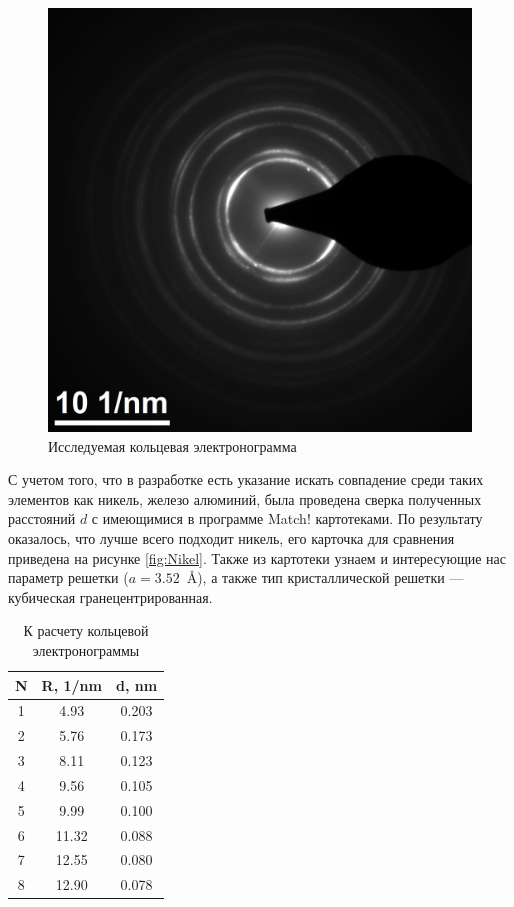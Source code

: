 \documentclass[a4paper, 12pt]{article}
\begin{document}
\begin{figure}[H]
	\centering
	\includegraphics[width=0.7\linewidth]{K3} 
	\caption{Исследуемая кольцевая электронограмма}
	\label{fig:circle}
\end{figure}

С учетом того, что в разработке есть указание искать совпадение среди таких элементов как никель, железо алюминий, была проведена сверка полученных расстояний $d$ с имеющимися в программе Match! картотеками. По результату оказалось, что лучше всего подходит никель, его карточка для сравнения приведена на рисунке \ref{fig:Nikel}. Также из картотеки узнаем и интересующие нас параметр решетки ($a = 3.52$~\AA), а также тип кристаллической решетки --- кубическая гранецентрированная.

\begin{table}[H]
	\centering
	\begin{tabular}{|c|c|c|}
		\hline
		N & R, 1/nm & d, nm \\
		\hline
		1 & 4.93 & 0.203  \\
		\hline
		2 & 5.76 & 0.173  \\
		\hline
		3 & 8.11 & 0.123  \\
		\hline
		4 & 9.56 & 0.105  \\
		\hline
		5 & 9.99 & 0.100  \\
		\hline
		6 & 11.32 & 0.088 \\
		\hline
		7 & 12.55 & 0.080  \\
		\hline
		8 & 12.90 & 0.078  \\
		\hline
	\end{tabular}
	\caption{К расчету кольцевой электронограммы}
\end{table}
\end{document}
